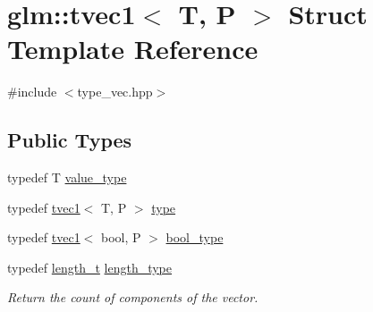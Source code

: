 \hypertarget{structglm_1_1tvec1}{}\section{glm\+::tvec1$<$ T, P $>$ Struct Template Reference}
\label{structglm_1_1tvec1}


{\ttfamily \#include $<$type\+\_\+vec.\+hpp$>$}

\subsection*{Public Types}
\begin{DoxyCompactItemize}
\item 
typedef T \mbox{\hyperlink{structglm_1_1tvec1_a7dd28a7610830a30c358090bde66c848}{value\+\_\+type}}
\item 
typedef \mbox{\hyperlink{structglm_1_1tvec1}{tvec1}}$<$ T, P $>$ \mbox{\hyperlink{structglm_1_1tvec1_a6f4d9547de6a649e654f93ffa832d9c2}{type}}
\item 
typedef \mbox{\hyperlink{structglm_1_1tvec1}{tvec1}}$<$ bool, P $>$ \mbox{\hyperlink{structglm_1_1tvec1_a0bb296cf2bfb6f0a8623528092e46b59}{bool\+\_\+type}}
\item 
typedef \mbox{\hyperlink{namespaceglm_a090a0de2260835bee80e71a702492ed9}{length\+\_\+t}} \mbox{\hyperlink{structglm_1_1tvec1_ae6254cf662020a8328b744b40f419527}{length\+\_\+type}}
\begin{DoxyCompactList}\small\item\em Return the count of components of the vector. \end{DoxyCompactList}\end{DoxyCompactItemize}
